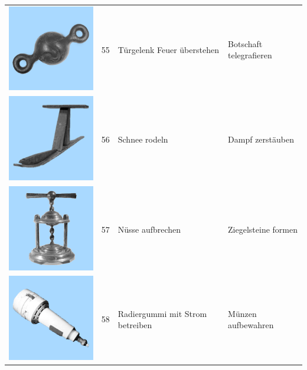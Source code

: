 \documentclass[
  english,
  man,floatsintext]{apa7}
\begin{document}
\begin{center}
\begin{ThreePartTable}
\begin{longtable}{llll}
\includegraphics[valign=c, scale=0.19]{../materials/unfamiliar/55.png} & 55 & Türgelenk Feuer überstehen & Botschaft telegrafieren\\
\includegraphics[valign=c, scale=0.19]{../materials/unfamiliar/56.png} & 56 & Schnee rodeln & Dampf zerstäuben\\
\includegraphics[valign=c, scale=0.19]{../materials/unfamiliar/57.png} & 57 & Nüsse aufbrechen & Ziegelsteine formen\\
\includegraphics[valign=c, scale=0.19]{../materials/unfamiliar/58.png} & 58 & Radiergummi mit Strom betreiben & Münzen aufbewahren\\

\end{longtable}
\end{ThreePartTable}
\end{center}
\end{document}
